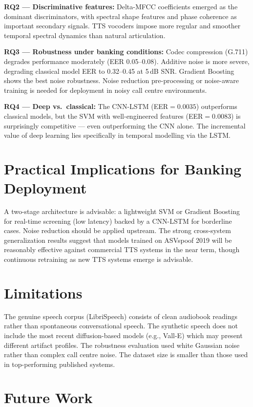 \documentclass[12pt, a4paper, oneside]{report}
\begin{document}
\textbf{RQ2 --- Discriminative features:} Delta-MFCC coefficients emerged as the dominant discriminators, with spectral shape features and phase coherence as important secondary signals. TTS vocoders impose more regular and smoother temporal spectral dynamics than natural articulation.

\textbf{RQ3 --- Robustness under banking conditions:} Codec compression (G.711) degrades performance moderately (EER 0.05--0.08). Additive noise is more severe, degrading classical model EER to 0.32--0.45 at 5\,dB SNR. Gradient Boosting shows the best noise robustness. Noise reduction pre-processing or noise-aware training is needed for deployment in noisy call centre environments.

\textbf{RQ4 --- Deep vs.\ classical:} The CNN-LSTM (EER$=0.0035$) outperforms classical models, but the SVM with well-engineered features (EER$=0.0083$) is surprisingly competitive --- even outperforming the CNN alone. The incremental value of deep learning lies specifically in temporal modelling via the LSTM.

\section{Practical Implications for Banking Deployment}

A two-stage architecture is advisable: a lightweight SVM or Gradient Boosting for real-time screening (low latency) backed by a CNN-LSTM for borderline cases. Noise reduction should be applied upstream. The strong cross-system generalization results suggest that models trained on ASVspoof 2019 will be reasonably effective against commercial TTS systems in the near term, though continuous retraining as new TTS systems emerge is advisable.

\section{Limitations}

The genuine speech corpus (LibriSpeech) consists of clean audiobook readings rather than spontaneous conversational speech. The synthetic speech does not include the most recent diffusion-based models (e.g., Vall-E) which may present different artifact profiles. The robustness evaluation used white Gaussian noise rather than complex call centre noise. The dataset size is smaller than those used in top-performing published systems.

\section{Future Work}
\end{document}
